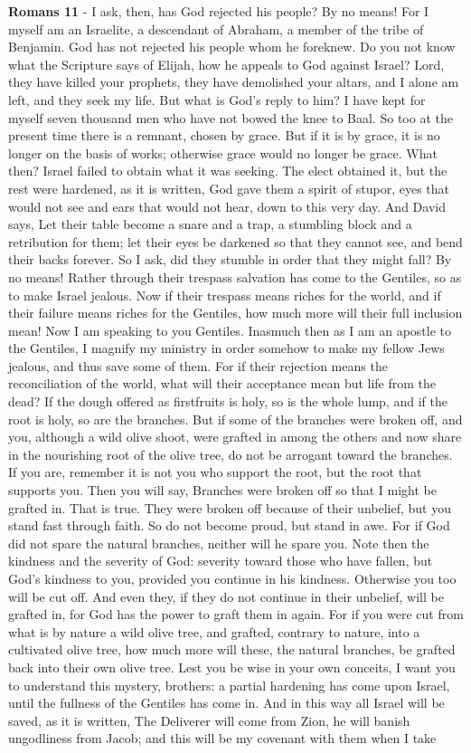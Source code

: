 \documentclass[11pt]{article}
\begin{document}
\textbf{Romans 11} - I ask, then, has God rejected his people? By no means! For I myself am an Israelite, a descendant of Abraham, a member of the tribe of Benjamin. God has not rejected his people whom he foreknew. Do you not know what the Scripture says of Elijah, how he appeals to God against Israel? Lord, they have killed your prophets, they have demolished your altars, and I alone am left, and they seek my life. But what is God's reply to him? I have kept for myself seven thousand men who have not bowed the knee to Baal. So too at the present time there is a remnant, chosen by grace. But if it is by grace, it is no longer on the basis of works; otherwise grace would no longer be grace. What then? Israel failed to obtain what it was seeking. The elect obtained it, but the rest were hardened, as it is written, God gave them a spirit of stupor, eyes that would not see and ears that would not hear, down to this very day. And David says, Let their table become a snare and a trap, a stumbling block and a retribution for them; let their eyes be darkened so that they cannot see, and bend their backs forever. So I ask, did they stumble in order that they might fall? By no means! Rather through their trespass salvation has come to the Gentiles, so as to make Israel jealous. Now if their trespass means riches for the world, and if their failure means riches for the Gentiles, how much more will their full inclusion mean! Now I am speaking to you Gentiles. Inasmuch then as I am an apostle to the Gentiles, I magnify my ministry in order somehow to make my fellow Jews jealous, and thus save some of them. For if their rejection means the reconciliation of the world, what will their acceptance mean but life from the dead? If the dough offered as firstfruits is holy, so is the whole lump, and if the root is holy, so are the branches. But if some of the branches were broken off, and you, although a wild olive shoot, were grafted in among the others and now share in the nourishing root of the olive tree, do not be arrogant toward the branches. If you are, remember it is not you who support the root, but the root that supports you. Then you will say, Branches were broken off so that I might be grafted in. That is true. They were broken off because of their unbelief, but you stand fast through faith. So do not become proud, but stand in awe. For if God did not spare the natural branches, neither will he spare you. Note then the kindness and the severity of God: severity toward those who have fallen, but God's kindness to you, provided you continue in his kindness. Otherwise you too will be cut off. And even they, if they do not continue in their unbelief, will be grafted in, for God has the power to graft them in again. For if you were cut from what is by nature a wild olive tree, and grafted, contrary to nature, into a cultivated olive tree, how much more will these, the natural branches, be grafted back into their own olive tree. Lest you be wise in your own conceits, I want you to understand this mystery, brothers: a partial hardening has come upon Israel, until the fullness of the Gentiles has come in. And in this way all Israel will be saved, as it is written, The Deliverer will come from Zion, he will banish ungodliness from Jacob; and this will be my covenant with them when I take 
\end{document}
